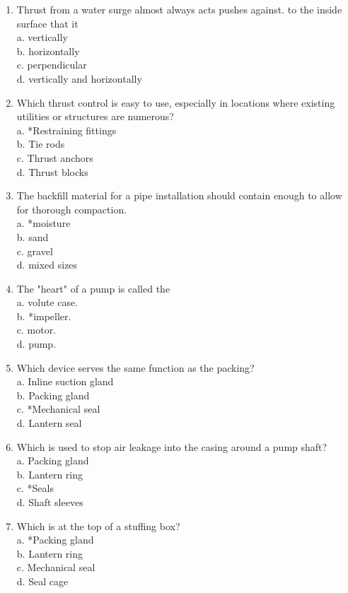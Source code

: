 \documentclass[10pt]{article}
\begin{document}
\begin{enumerate}
  \item Thrust from a water surge almost always acts pushes against. to the inside surface that it\\
a. vertically\\
b. horizontally\\
c. perpendicular\\
d. vertically and horizontally

  \item Which thrust control is easy to use, especially in locations where existing utilities or structures are numerous?\\
a. *Restraining fittings\\
b. Tie rods\\
c. Thrust anchors\\
d. Thrust blocks

  \item The backfill material for a pipe installation should contain enough to allow for thorough compaction.\\
a. *moisture\\
b. sand\\
c. gravel\\
d. mixed sizes

  \item The "heart" of a pump is called the\\
a. volute case.\\
b. *impeller.\\
c. motor.\\
d. pump.

  \item Which device serves the same function as the packing?\\
a. Inline suction gland\\
b. Packing gland\\
c. *Mechanical seal\\
d. Lantern seal

  \item Which is used to stop air leakage into the casing around a pump shaft?\\
a. Packing gland\\
b. Lantern ring\\
c. *Seals\\
d. Shaft sleeves

  \item Which is at the top of a stuffing box?\\
a. *Packing gland\\
b. Lantern ring\\
c. Mechanical seal\\
d. Seal cage 


\end{enumerate}
\end{document}
